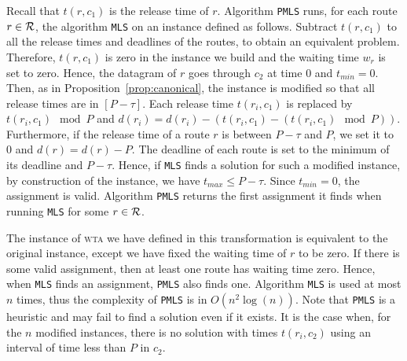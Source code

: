 \documentclass[a4paper,10pt]{journal}
\newcommand\MLS{\texttt{MLS}\xspace}
\newcommand\PMLS{\texttt{PMLS}\xspace}
\newcommand\wta{\textsc{wta}\xspace}
\begin{document}
      Recall that $t(r,c_1)$ is the release time of $r$. Algorithm \PMLS runs, for each route $r \in \cal{R}$, the algorithm \MLS on an instance defined as follows. Subtract $t(r,c_1)$ to all the release times and deadlines of the routes, to obtain an equivalent problem. Therefore, $t(r,c_1)$ is zero in the instance we build and the waiting time $w_r$ is set to zero. Hence, the datagram of $r$ goes through $c_2$ at time $0$ and $t_{min} = 0$.
     Then, as in Proposition~\ref{prop:canonical}, the instance is modified so that all release times are in $[P-\tau]$. Each release time $t(r_i,c_1)$ is replaced by $t(r_i,c_1) \mod P$ and $d(r_i) = d(r_i) - (t(r_i,c_1) - (t(r_i,c_1) \mod P))$. Furthermore, if the release time of a route $r$ is between $P-\tau$ and $P$, we set it to $0$ and $d(r) = d(r) - P$.  The deadline of each route is set to the minimum of its deadline and $P - \tau$. Hence, if \MLS finds a solution for such a modified instance, by construction of the instance, we have $t_{max} \leq P -\tau $. Since $t_{min} = 0$, the assignment is valid. Algorithm \PMLS returns the first assignment it finds when running \MLS for some $r \in \cal{R}$.

     The instance of \wta we have defined in this transformation is equivalent 
     to the original instance, except we have fixed the waiting time of 
     $r$ to be zero. If there is some valid assignment, then at least one route has waiting time zero. Hence, when \MLS finds an assignment, \PMLS also finds one. Algorithm \MLS is used at most $n$ times, thus the complexity of \PMLS is in $O(n^2\log(n))$. Note that \PMLS is a heuristic and may fail to find a solution even if it exists. It is the case when, for the $n$ modified instances, there is no solution with times $t(r_i,c_2)$ using an interval of time less than $P$ in $c_2$. 



%   
%     
% 
%     
% 
% 
\end{document}
